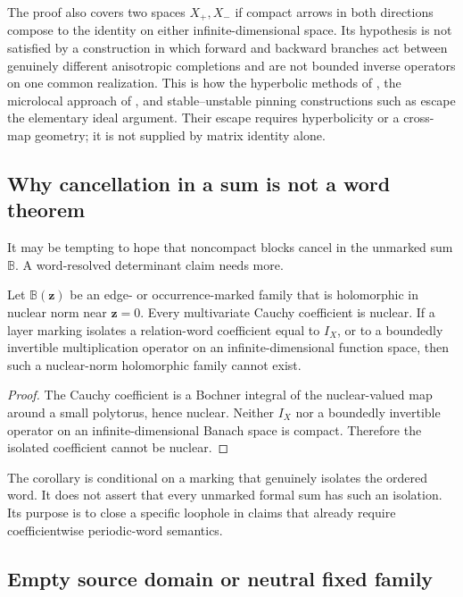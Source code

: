 The proof also covers two spaces $X_+,X_-$ if compact arrows in both
directions compose to the identity on either infinite-dimensional space.  Its
hypothesis is not satisfied by a construction in which forward and backward
branches act between genuinely different anisotropic completions and are not
bounded inverse operators on one common realization.  This is how the
hyperbolic methods of \citet{GouezelLiverani2006}, the microlocal approach of
\citet{DyatlovZworski2016}, and stable--unstable pinning constructions such as
\citet{Fried1995,BaladiPujalsSambarino2005} escape the elementary ideal
argument.  Their escape requires hyperbolicity or a cross-map geometry; it is
not supplied by matrix identity alone.

\subsection{Why cancellation in a sum is not a word theorem}

It may be tempting to hope that noncompact blocks cancel in the unmarked sum
$\mathbb B$.  A word-resolved determinant claim needs more.

\begin{corollary}
\label{cor:marked-isolation}
Let $\mathbb B(\mathbf z)$ be an edge- or occurrence-marked family that is
holomorphic in nuclear norm near $\mathbf z=0$.  Every multivariate Cauchy
coefficient is nuclear.  If a layer marking isolates a relation-word
coefficient equal to $I_X$, or to a boundedly invertible multiplication
operator on an infinite-dimensional function space, then such a nuclear-norm
holomorphic family cannot exist.
\end{corollary}

\begin{proof}
The Cauchy coefficient is a Bochner integral of the nuclear-valued map around
a small polytorus, hence nuclear.  Neither $I_X$ nor a boundedly invertible
operator on an infinite-dimensional Banach space is compact.  Therefore the
isolated coefficient cannot be nuclear.
\end{proof}

The corollary is conditional on a marking that genuinely isolates the ordered
word.  It does not assert that every unmarked formal sum has such an
isolation.  Its purpose is to close a specific loophole in claims that already
require coefficientwise periodic-word semantics.

\subsection{Empty source domain or neutral fixed family}

